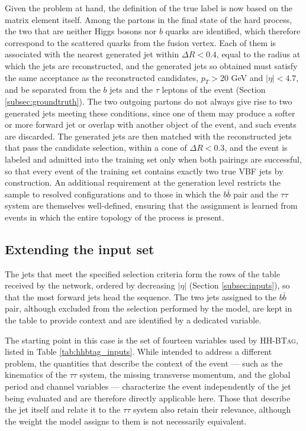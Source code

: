Given the problem at hand, the definition of the true label is now based on the matrix element itself. Among the partons in the final state of the hard process, the two that are neither Higgs bosons nor $b$ quarks are identified, which therefore correspond to the scattered quarks from the fusion vertex. Each of them is associated with the nearest generated jet within $\Delta R < 0.4$, equal to the radius at which the jets are reconstructed, and the generated jets so obtained must satisfy the same acceptance as the reconstructed candidates, $p_T > 20$ GeV and $|\eta| < 4.7$, and be separated from the $b$ jets and the $\tau$ leptons of the event (Section \ref{subsec:groundtruth}). The two outgoing partons do not always give rise to two generated jets meeting these conditions, since one of them may produce a softer or more forward jet or overlap with another object of the event, and such events are discarded. The generated jets are then matched with the reconstructed jets that pass the candidate selection, within a cone of $\Delta R < 0.3$, and the event is labeled and admitted into the training set only when both pairings are successful, so that every event of the training set contains exactly two true VBF jets by construction. An additional requirement at the generation level restricts the sample to resolved configurations and to those in which the $b\bar{b}$ pair and the $\tau\tau$ system are themselves well-defined, ensuring that the assignment is learned from events in which the entire topology of the process is present.\medskip



\subsection{Extending the input set}
\label{subsec:vbf_inputs}
%
The jets that meet the specified selection criteria form the rows of the table received by the network, ordered by decreasing $|\eta|$ (Section \ref{subsec:inputs}), so that the most forward jets head the sequence. The two jets assigned to the $b\bar{b}$ pair, although excluded from the selection performed by the model, are kept in the table to provide context and are identified by a dedicated variable.\medskip

The starting point in this case is the set of fourteen variables used by \textsc{HH-BTag}, listed in Table \ref{tab:hhbtag_inputs}. While intended to address a different problem, the quantities that describe the context of the event — such as the kinematics of the $\tau\tau$ system, the missing transverse momentum, and the global period and channel variables — characterize the event independently of the jet being evaluated and are therefore directly applicable here. Those that describe the jet itself and relate it to the $\tau\tau$ system also retain their relevance, although the weight the model assigns to them is not necessarily equivalent.

